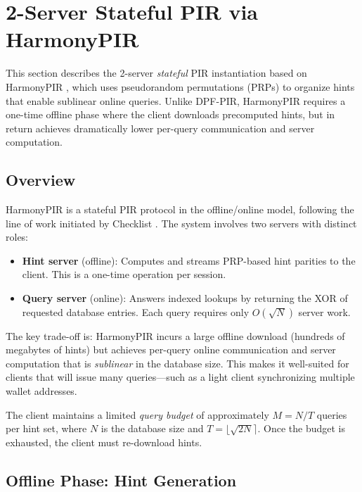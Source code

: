 \section{2-Server Stateful PIR via HarmonyPIR}
\label{sec:harmonypir}

This section describes the 2-server \emph{stateful} PIR instantiation based on HarmonyPIR \cite{ar26fpe}, which uses pseudorandom permutations (PRPs) to organize hints that enable sublinear online queries. Unlike DPF-PIR, HarmonyPIR requires a one-time offline phase where the client downloads precomputed hints, but in return achieves dramatically lower per-query communication and server computation.

\subsection{Overview}

HarmonyPIR is a stateful PIR protocol in the offline/online model, following the line of work initiated by Checklist \cite{checklist21}. The system involves two servers with distinct roles:
\begin{itemize}[nolistsep,leftmargin=*]
    \item \textbf{Hint server} (offline): Computes and streams PRP-based hint parities to the client. This is a one-time operation per session.
    \item \textbf{Query server} (online): Answers indexed lookups by returning the XOR of requested database entries. Each query requires only $O(\sqrt{N})$ server work.
\end{itemize}

The key trade-off is: HarmonyPIR incurs a large offline download (hundreds of megabytes of hints) but achieves per-query online communication and server computation that is \emph{sublinear} in the database size. This makes it well-suited for clients that will issue many queries---such as a light client synchronizing multiple wallet addresses.

The client maintains a limited \emph{query budget} of approximately $M = N/T$ queries per hint set, where $N$ is the database size and $T = \lfloor\sqrt{2N}\rceil$. Once the budget is exhausted, the client must re-download hints.

\subsection{Offline Phase: Hint Generation}
\label{sec:harmony-offline}

